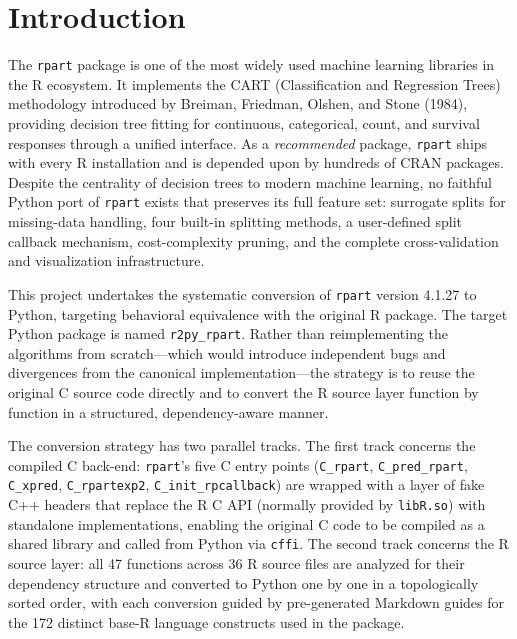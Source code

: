 \documentclass[12pt]{article}
\begin{document}
\newpage
\section{Introduction}
\label{sec:intro}

The \texttt{rpart} package is one of the most widely used machine learning libraries in the R ecosystem. It implements the CART (Classification and Regression Trees) methodology introduced by Breiman, Friedman, Olshen, and Stone (1984), providing decision tree fitting for continuous, categorical, count, and survival responses through a unified interface. As a \emph{recommended} package, \texttt{rpart} ships with every R installation and is depended upon by hundreds of CRAN packages. Despite the centrality of decision trees to modern machine learning, no faithful Python port of \texttt{rpart} exists that preserves its full feature set: surrogate splits for missing-data handling, four built-in splitting methods, a user-defined split callback mechanism, cost-complexity pruning, and the complete cross-validation and visualization infrastructure.

This project undertakes the systematic conversion of \texttt{rpart} version 4.1.27 to Python, targeting behavioral equivalence with the original R package. The target Python package is named \texttt{r2py\_rpart}. Rather than reimplementing the algorithms from scratch—which would introduce independent bugs and divergences from the canonical implementation—the strategy is to reuse the original C source code directly and to convert the R source layer function by function in a structured, dependency-aware manner.

The conversion strategy has two parallel tracks. The first track concerns the compiled C back-end: \texttt{rpart}'s five C entry points (\texttt{C\_rpart}, \texttt{C\_pred\_rpart}, \texttt{C\_xpred}, \texttt{C\_rpartexp2}, \texttt{C\_init\_rpcallback}) are wrapped with a layer of fake C++ headers that replace the R C API (normally provided by \texttt{libR.so}) with standalone implementations, enabling the original C code to be compiled as a shared library and called from Python via \texttt{cffi}. The second track concerns the R source layer: all 47 functions across 36 R source files are analyzed for their dependency structure and converted to Python one by one in a topologically sorted order, with each conversion guided by pre-generated Markdown guides for the 172 distinct base-R language constructs used in the package.
\end{document}
